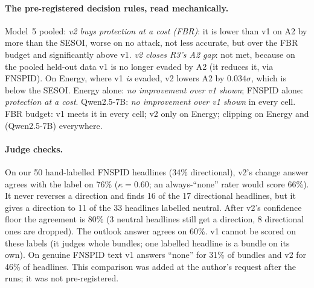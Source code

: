 \paragraph{The pre-registered decision rules, read mechanically.} Model~5 pooled: \emph{v2 buys
protection at a cost (FBR)}: it is lower than v1 on A2 by more than the SESOI, worse on no attack,
not less accurate, but over the FBR budget and significantly above v1. \emph{v2 closes R3's A2
gap}: not met, because on the pooled held-out data v1 is no longer evaded by A2 (it reduces it,
via FNSPID). On Energy, where v1 \emph{is} evaded, v2 lowers A2 by $0.034\sigma$, which is below
the SESOI. Energy alone: \emph{no improvement over v1 shown}; FNSPID alone: \emph{protection at a
cost}. Qwen2.5-7B: \emph{no improvement over v1 shown} in every cell. FBR budget: v1 meets it in
every cell; v2 only on Energy; clipping on Energy and (Qwen2.5-7B) everywhere.

\paragraph{Judge checks.} On our 50 hand-labelled FNSPID headlines (34\% directional), v2's
change answer agrees with the label on 76\% ($\kappa = 0.60$; an always-``none'' rater would score
66\%). It never reverses a direction and finds 16 of the 17 directional headlines, but it gives a
direction to 11 of the 33 headlines labelled neutral. After v2's confidence floor the agreement is
80\% (3 neutral headlines still get a direction, 8 directional ones are dropped). The outlook
answer agrees on 60\%. v1 cannot be scored on these labels (it judges whole bundles; one labelled
headline is a bundle on its own). On genuine FNSPID text v1 answers ``none'' for 31\% of bundles
and v2 for 46\% of headlines. This comparison was added at the author's request after the runs;
it was not pre-registered.

